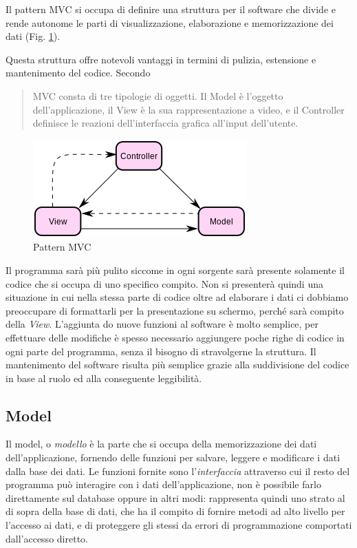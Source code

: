 Il pattern MVC si occupa di definire una struttura per il software che divide e rende autonome le parti di visualizzazione, elaborazione e memorizzazione dei dati (Fig. \ref{img:mvc}).

Questa struttura offre notevoli vantaggi in termini di pulizia, estensione e mantenimento del codice. Secondo \cite[p. 4]{designpatterns}
\begin{quote}
MVC consta di tre tipologie di oggetti. Il Model è l'oggetto dell'applicazione, il View è la sua rappresentazione a video, e il Controller definisce le reazioni dell'interfaccia grafica all'input dell'utente.
\end{quote}

\begin{figure}[ht!]
	\label{img:mvc}
	\centering
	\includegraphics[width=\textwidth]{img/mvc1.png}
	\caption{Pattern MVC}
\end{figure}

Il programma sarà più pulito siccome in ogni sorgente sarà presente solamente il codice che si occupa di uno specifico compito. Non si presenterà quindi una situazione in cui nella stessa parte di codice oltre ad elaborare i dati ci dobbiamo preoccupare di formattarli per la presentazione su schermo, perché sarà compito della \emph{View}. L'aggiunta do nuove funzioni al software è molto semplice, per effettuare delle modifiche è spesso necessario aggiungere poche righe di codice in ogni parte del programma, senza il bisogno di stravolgerne la struttura. Il mantenimento del software risulta più semplice grazie alla suddivisione del codice in base al ruolo ed alla conseguente leggibilità.


\subsection{Model}
Il model, o \emph{modello} è la parte che si occupa della memorizzazione dei dati dell'applicazione, fornendo delle funzioni per salvare, leggere e modificare i dati dalla base dei dati. Le funzioni fornite sono l'\emph{interfaccia} attraverso cui il resto del programma può interagire con i dati dell'applicazione, non è possibile farlo direttamente sul database oppure in altri modi: rappresenta quindi uno strato al di sopra della base di dati, che ha il compito di fornire metodi ad alto livello per l'accesso ai dati, e di proteggere gli stessi da errori di programmazione comportati dall'accesso diretto.


